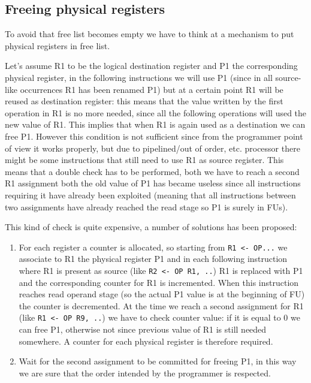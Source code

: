\subsection{Freeing physical registers}

To avoid that free list becomes empty we have to think at a mechanism to put physical registers in free list.

Let's assume R1 to be the logical destination register and P1 the corresponding physical register, in the following instructions we will use P1 (since in all source-like occurrences R1 has been renamed P1) but at a certain point R1 will be reused as destination register: this means that the value written by the first operation in R1 is no more needed, since all the following operations will used the new value of R1. This implies that when R1 is again used as a destination we can free P1.
However this condition is not sufficient since from the programmer point of view it works properly, but due to pipelined/out of order, etc. processor there might be some instructions that still need to use R1 as source register. This means that a double check has to be performed, both we have to reach a second R1 assignment both the old value of P1 has became useless since all instructions requiring it have already been exploited (meaning that all instructions between two assignments have already reached the read stage so P1 is surely in FUs).

This kind of check is quite expensive, a number of solutions has been proposed:

\begin{enumerate}
  \item For each register a counter is allocated, so starting from \verb|R1 <- OP...| we associate to R1 the physical register P1 and in each following instruction where R1 is present as source (like \verb|R2 <- OP R1, ..|) R1 is replaced with P1 and the corresponding counter for R1 is incremented. When this instruction reaches read operand stage (so the actual P1 value is at the beginning of FU) the counter is decremented. At the time we reach a second assignment for R1 (like \verb|R1 <- OP R9, ..|) we have to check counter value: if it is equal to 0 we can free P1, otherwise not since previous value of R1 is still needed somewhere. A counter for each physical register is therefore required.

  \item Wait for the second assignment to be committed for freeing P1, in this way we are sure that the order intended by the programmer is respected.

\end{enumerate}

